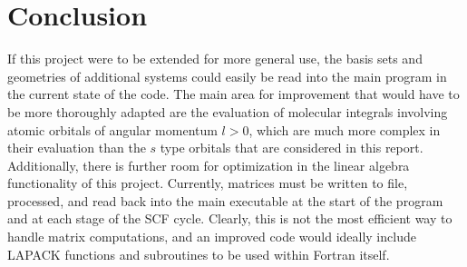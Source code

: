 \documentclass[%
 aip,
 amsmath,amssymb,
 reprint,%
]{revtex4-1}
\begin{document}
\section{Conclusion}
If this project were to be extended for more general use, the basis sets and
geometries of additional systems could easily be read into the main program
in the current state of the code. The main area for improvement that would
have to be more thoroughly adapted are the evaluation of molecular integrals 
involving atomic orbitals of angular momentum $l > 0$, which are much more
complex in their evaluation than the $s$ type orbitals that are considered in
this report. Additionally, there is further room for optimization in the
linear algebra functionality of this project. Currently, matrices must be
written to file, processed, and read back into the main executable at the
start of the program and at each stage of the SCF cycle. Clearly, this is not
the most efficient way to handle matrix computations, and an improved code
would ideally include LAPACK functions and subroutines to be used within
Fortran itself.



\end{document}

